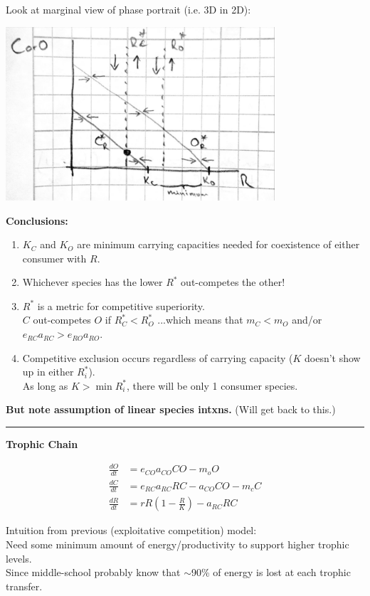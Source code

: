 \documentclass{article}
\newcommand{\ind}{\-\hspace{1cm}}
\begin{document}
Look at marginal view of phase portrait (i.e. 3D in 2D):
\begin{center}
 	\includegraphics[width=10cm]{figs/LVcomp.pdf}
\end{center}

\textbf{Conclusions:}
\begin{enumerate}
\item $K_C$ and $K_O$ are minimum carrying capacities needed for coexistence of either consumer with $R$.
\item Whichever species has the lower $R^*$ out-competes the other!
\item $R^*$ is a metric for competitive superiority.\\
\ind $C$ out-competes $O$ if $R_C^* < R_O^*$ ...which means that $m_C < m_O$ and/or $e_{RC} a_{RC} > e_{RO} a_{RO}$.

\item Competitive exclusion occurs regardless of carrying capacity ($K$ doesn't show up in either $R_i^*$).\\
\ind As long as $K>\min R_i^*$, there will be only 1 consumer species.\\
\end{enumerate}
\textbf{But note assumption of linear species intxns.}  (Will get back to this.)

\rule[0.5ex]{\linewidth}{1pt}
\pagebreak
\begin{center}	\textbf{Trophic Chain} \end{center}
\begin{align*}
		\frac{dO}{dt}&=e_{CO}a_{CO}C O - m_o O\\
		\frac{dC}{dt}&=e_{RC}a_{RC}R C -a_{CO}CO- m_c C\\
		\frac{dR}{dt}&=r R \left(1-\frac{R}{K}\right) - a_{RC}RC
\end{align*}

Intuition from previous (exploitative competition) model:\\
\ind Need some minimum amount of energy/productivity to support higher trophic levels.\\
\ind Since middle-school probably know that $\sim$90\% of energy is lost at each trophic transfer.\\
\end{document}
